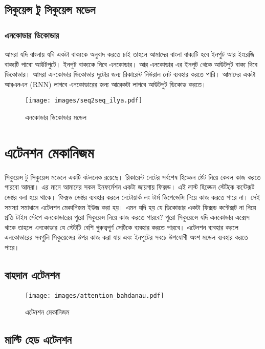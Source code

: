 \documentclass{article}[book]
\begin{document}
\subsection{সিকুয়েন্স টু সিকুয়েন্স মডেল} 
\subsubsection{এনকোডার ডিকোডার}
আমরা যদি বাংলায় যদি একটা বাক্যকে অনুবাদ করতে চাই তাহলে আমাদের বাংলা বাক্যটি হবে ইনপুট আর ইংরেজি বাক্যটি পাবো আউটপুটে। 
ইনপুট বাক্যকে নিবে এনকোডার। আর এনকোডার এর ইনপুট থেকে আউটপুট বাক্য দিবে ডিকোডার। আমরা এনকোডার ডিকোডার দুটোর জন্য রিকারেন্ট নিউরাল নেট ব্যবহার করতে পারি।
আমাদের একটা আরএনএন (RNN)  লাগবে এনকোডারের জন্য আরেকটা লাগবে আউটপুট ডিকোড করতে। 
\begin{figure}[htbp] %
   \centering
   \texttt{[image: images/seq2seq\_ilya.pdf]} 
   \caption{এনকোডার ডিকোডার মডেল }
   \label{fig:seq2seq}
\end{figure} 


\section{এটেনশন মেকানিজম}
সিকুয়েন্স টু সিকুয়েন্স মডেলে একটি বটলনেক রয়েছে। রিকারেন্ট নেটের সর্বশেষ হিড্ডেন ষ্টেট নিয়ে কেবল কাজ করতে পারবো আমরা। এর মানে আমাদের সকল ইনফর্মেশন একটা জায়গায় ফিক্সড।
এই লাস্ট হিড্ডেন স্টেটকে কন্টেক্সট ভেক্টর বলা হয়ে থাকে। ফিক্সড ভেক্টর ব্যবহার করলে নেটোয়ার্ক লং টার্ম ডিপেন্ডেন্সি নিয়ে কাজ করতে পারে না।
 সেই সমস্যা সমাধানে এটেনশন মেকানিজম ইউজ করা হয়। এমন যদি হয় যে ডিকোডার একটা ফিক্সড কন্টেক্সট না নিয়ে প্রতি টাইম স্টেপে এনকোডারের পুরো সিকুয়েন্স নিয়ে কাজ করতে পারবে?
 পুরো সিকুয়েন্সে যদি এনকোডার এক্সেস থাকে তাহলে এনকোডার যে স্টেটটি বেশি গুরুত্বপূর্ণ সেটিকে ব্যবহার করতে পারবে।  
 এটেনশন ব্যবহার করলে এনকোডারের সবগুলি সিকুয়েন্সের উপর কাজ করা যায় এবং ইনপুটের সবচে উপযোগী অংশ মডেল ব্যবহার করতে পারে। 

\subsection{বাহদান এটেনশন}

\begin{figure}[htbp] %
   \centering
   \texttt{[image: images/attention\_bahdanau.pdf]} 
   \caption{এটেনশন মেকানিজম}
   \label{fig:attn_bahdanau}
\end{figure} 

\subsection{মাল্টি হেড এটেনশন}
\end{document}
